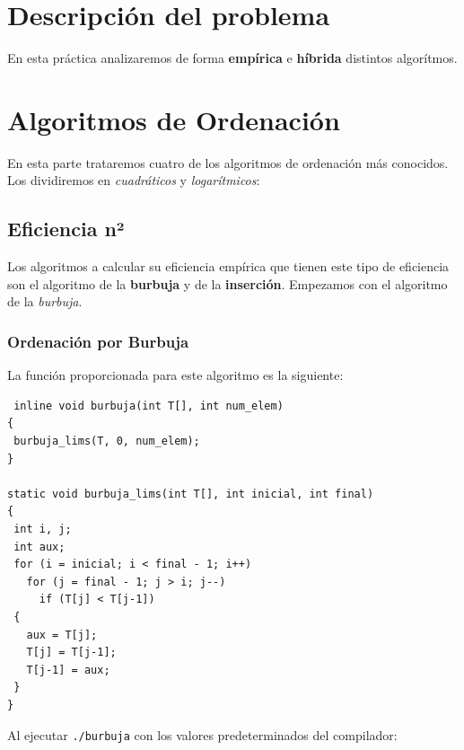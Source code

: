 \documentclass[12pt, spanish]{article}
\def\code#1{\texttt{#1}}
\begin{document}
\newpage



\tableofcontents
\pagebreak


\section{Descripción del problema}
En esta práctica analizaremos de forma \textbf{empírica} e \textbf{híbrida} distintos algorítmos.

\section{Algoritmos de Ordenación}
En esta parte trataremos cuatro de los algoritmos de ordenación más conocidos. Los dividiremos en \emph{cuadráticos} y \emph{logarítmicos}:

\subsection{Eficiencia n²}
Los algoritmos a calcular su eficiencia empírica que tienen este tipo de eficiencia son el algoritmo de la \textbf{burbuja} y de la \textbf{inserción}.
Empezamos con el algoritmo de la \emph{burbuja}.

\subsubsection{Ordenación por Burbuja}
La función proporcionada para este algoritmo es la siguiente:
\begin{verbatim}
 inline void burbuja(int T[], int num_elem)
{
 burbuja_lims(T, 0, num_elem);
}

static void burbuja_lims(int T[], int inicial, int final)
{
 int i, j;
 int aux;
 for (i = inicial; i < final - 1; i++)
   for (j = final - 1; j > i; j--)
     if (T[j] < T[j-1])
 {
   aux = T[j];
   T[j] = T[j-1];
   T[j-1] = aux;
 }
}
\end{verbatim}

\renewcommand{\arraystretch}{1.25}
\newpage
Al ejecutar \textcolor{BrickRed}{\code{./burbuja}} con los valores predeterminados del compilador:


\newpage
\end{document}
